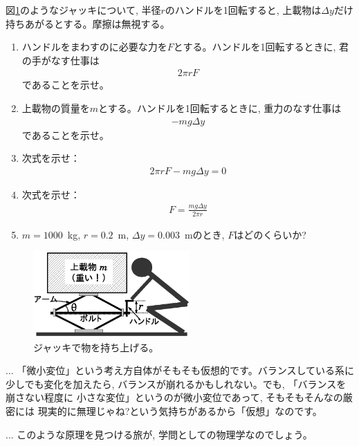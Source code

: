 \begin{q}\label{q:jack}
図\ref{fig:jack}のようなジャッキについて, 半径$r$のハンドルを1回転すると, 
上載物は$\Delta y$だけ持ちあがるとする。摩擦は無視する。
\begin{enumerate}
\item ハンドルをまわすのに必要な力を$F$とする。ハンドルを1回転するときに, 君の手がなす仕事は
\begin{eqnarray}2\pi r F\end{eqnarray}
であることを示せ。
\item 上載物の質量を$m$とする。ハンドルを1回転するときに, 重力のなす仕事は
\begin{eqnarray}-mg\Delta y\end{eqnarray}
であることを示せ。
\item 次式を示せ：
\begin{eqnarray}2\pi r F-mg\Delta y=0\end{eqnarray}
\item 次式を示せ：
\begin{eqnarray}F=\frac{mg\Delta y}{2\pi r}\end{eqnarray}
\item $m=1000$~kg, $r=0.2$~m, $\Delta y=0.003$~mのとき, $F$はどのくらいか?
\end{enumerate}
\begin{figure}[h]
    \centering
    \includegraphics[width=6cm]{jack.eps}
    \caption{ジャッキで物を持ち上げる。}\label{fig:jack}
\end{figure}
\end{q}

\begin{faq}{\small{}
... 「微小変位」という考え方自体がそもそも仮想的です。バランスしている系に
少しでも変化を加えたら, バランスが崩れるかもしれない。でも, 「バランスを崩さない程度に
小さな変位」というのが微小変位であって, そもそもそんなの厳密には
現実的に無理じゃね?という気持ちがあるから「仮想」なのです。}\end{faq}\mv

\begin{faq}{\small{}
... このような原理を見つける旅が, 学問としての物理学なのでしょう。}\end{faq}
\hv



